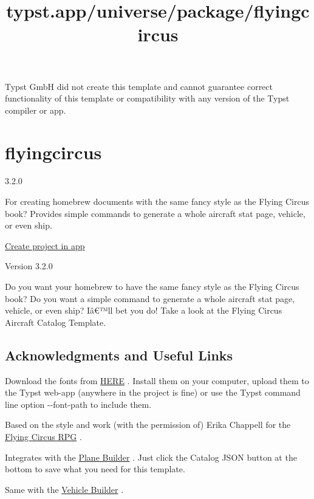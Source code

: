Typst GmbH did not create this template and cannot guarantee correct
functionality of this template or compatibility with any version of the
Typst compiler or app.


\title{typst.app/universe/package/flyingcircus}

\label{banner}
\label{template-thumbnail}

\section{flyingcircus}\label{flyingcircus}

{ 3.2.0 }

For creating homebrew documents with the same fancy style as the Flying
Circus book? Provides simple commands to generate a whole aircraft stat
page, vehicle, or even ship.

\href{/app?template=flyingcircus&version=3.2.0}{Create project in app}

\label{readme}
Version 3.2.0

Do you want your homebrew to have the same fancy style as the Flying
Circus book? Do you want a simple command to generate a whole aircraft
stat page, vehicle, or even ship? Iâ€™ll bet you do! Take a look at the
Flying Circus Aircraft Catalog Template.

\subsection{Acknowledgments and Useful
Links}\label{acknowledgments-and-useful-links}

Download the fonts from
\href{https://github.com/Tetragramm/flying-circus-typst-template/archive/refs/heads/Fonts.zip}{HERE}
. Install them on your computer, upload them to the Typst web-app
(anywhere in the project is fine) or use the Typst command line option
-\/-font-path to include them.

Based on the style and work (with the permission of) Erika Chappell for
the \href{https://opensketch.itch.io/flying-circus}{Flying Circus RPG} .

Integrates with the
\href{https://tetragramm.github.io/PlaneBuilder/index.html}{Plane
Builder} . Just click the Catalog JSON button at the bottom to save what
you need for this template.

Same with the
\href{https://tetragramm.github.io/VehicleBuilder/}{Vehicle Builder} .

